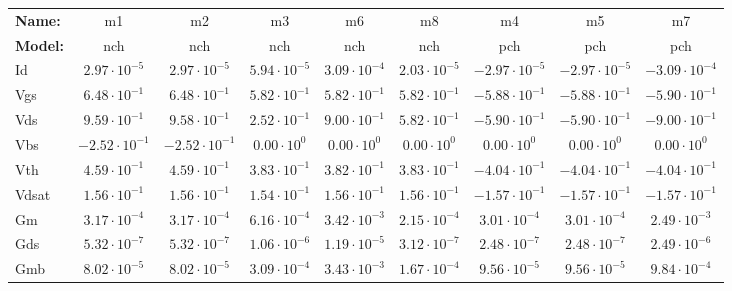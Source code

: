 \begin{table}[h!]
    \hspace{-13mm}
    \scriptsize
    \begin{tabular}{lcccccccc}
        \hline
        \textbf{Name:} & m1 & m2 & m3 & m6 & m8 & m4 & m5 & m7 \\
        \textbf{Model:} & nch & nch & nch & nch & nch & pch & pch & pch \\
        \hline
        Id & \(2.97\cdot10^{-5}\) & \(2.97\cdot10^{-5}\) & \(5.94\cdot10^{-5}\) & \(3.09\cdot10^{-4}\) & \(2.03\cdot10^{-5}\) & \(-2.97\cdot10^{-5}\) & \(-2.97\cdot10^{-5}\) & \(-3.09\cdot10^{-4}\) \\
        Vgs & \(6.48\cdot10^{-1}\) & \(6.48\cdot10^{-1}\) & \(5.82\cdot10^{-1}\) & \(5.82\cdot10^{-1}\) & \(5.82\cdot10^{-1}\) & \(-5.88\cdot10^{-1}\) & \(-5.88\cdot10^{-1}\) & \(-5.90\cdot10^{-1}\) \\
        Vds & \(9.59\cdot10^{-1}\) & \(9.58\cdot10^{-1}\) & \(2.52\cdot10^{-1}\) & \(9.00\cdot10^{-1}\) & \(5.82\cdot10^{-1}\) & \(-5.90\cdot10^{-1}\) & \(-5.90\cdot10^{-1}\) & \(-9.00\cdot10^{-1}\) \\
        Vbs & \(-2.52\cdot10^{-1}\) & \(-2.52\cdot10^{-1}\) & \(0.00\cdot10^{0}\) & \(0.00\cdot10^{0}\) & \(0.00\cdot10^{0}\) & \(0.00\cdot10^{0}\) & \(0.00\cdot10^{0}\) & \(0.00\cdot10^{0}\) \\
        Vth & \(4.59\cdot10^{-1}\) & \(4.59\cdot10^{-1}\) & \(3.83\cdot10^{-1}\) & \(3.82\cdot10^{-1}\) & \(3.83\cdot10^{-1}\) & \(-4.04\cdot10^{-1}\) & \(-4.04\cdot10^{-1}\) & \(-4.04\cdot10^{-1}\) \\
        Vdsat & \(1.56\cdot10^{-1}\) & \(1.56\cdot10^{-1}\) & \(1.54\cdot10^{-1}\) & \(1.56\cdot10^{-1}\) & \(1.56\cdot10^{-1}\) & \(-1.57\cdot10^{-1}\) & \(-1.57\cdot10^{-1}\) & \(-1.57\cdot10^{-1}\) \\
        Gm & \(3.17\cdot10^{-4}\) & \(3.17\cdot10^{-4}\) & \(6.16\cdot10^{-4}\) & \(3.42\cdot10^{-3}\) & \(2.15\cdot10^{-4}\) & \(3.01\cdot10^{-4}\) & \(3.01\cdot10^{-4}\) & \(2.49\cdot10^{-3}\) \\
        Gds & \(5.32\cdot10^{-7}\) & \(5.32\cdot10^{-7}\) & \(1.06\cdot10^{-6}\) & \(1.19\cdot10^{-5}\) & \(3.12\cdot10^{-7}\) & \(2.48\cdot10^{-7}\) & \(2.48\cdot10^{-7}\) & \(2.49\cdot10^{-6}\) \\
        Gmb & \(8.02\cdot10^{-5}\) & \(8.02\cdot10^{-5}\) & \(3.09\cdot10^{-4}\) & \(3.43\cdot10^{-3}\) & \(1.67\cdot10^{-4}\) & \(9.56\cdot10^{-5}\) & \(9.56\cdot10^{-5}\) & \(9.84\cdot10^{-4}\) \\

\end{tabular}
\end{table}
